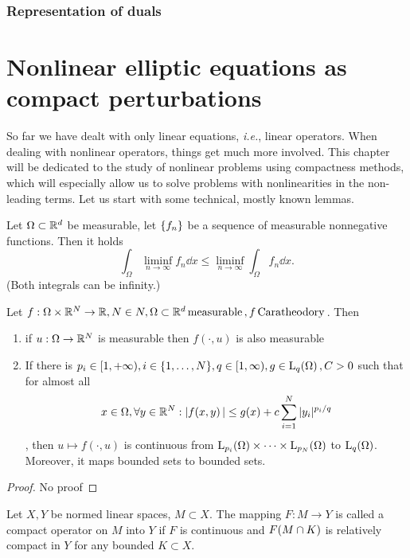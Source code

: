 \documentclass{article}
\begin{document}
\subsubsection{Representation of duals}
\label{sec:dual_representation}

\section{Nonlinear elliptic equations as compact perturbations}
\label{sec:nonlinear_elliptic_compact}

So far we have dealt with only linear equations, \textit{i.e.}, linear operators. When dealing with nonlinear operators, things get much more involved. This chapter will be dedicated to the study of nonlinear problems using compactness methods, which will especially allow us to solve problems with nonlinearities in the non-leading terms. Let us start with some technical, mostly known lemmas.

\begin{lemma}[Fatou]
	Let $\Omega \subset {\mathbb R}^{d}$ be measurable, let $\qty{f_n}$ be a sequence of measurable nonnegative functions. Then it holds
	\[
		\int_{\Omega}\liminf_{n\to \infty}f_n\dd{x} \leq \liminf_{n \to \infty}\int_{\Omega}f_n\dd{x}.
	\]
	(Both integrals can be infinity.)
    
\end{lemma}

\begin{theorem}[Nemytskii]
	Let $f: \Omega \times {\mathbb R}^N \to {\mathbb R}, N \in N, \Omega \subset {\mathbb R}^d \, \text{measurable} \,, f \, \text{Caratheodory} \,$. Then
	\begin{enumerate}
		\item if $u: \Omega \to {\mathbb R}^N$ is measurable then $f(\cdot, u)$ is also measurable
		\item If there is $p_i \in [1, +\infty), i \in \{1,\dots,N\}, q \in [1, \infty), g \in \LpSet[q]{\Omega}, C>0$ such that for almost all
			\[
				x \in \Omega, \forall y \in {\mathbb R}^N: |f\qty(x,y)| \leq g(x) + c \sum_{i=1}^N |y_i|^{p_i/q}
			\]
			, then $u \mapsto f(\cdot, u)$ is continuous from $\LpSet[p_i]{\Omega} \times \dots \times \LpSet[p_N]{\Omega}$ to $\LpSet[q]{\Omega}$. Moreover, it maps bounded sets to bounded sets.
	\end{enumerate}
\end{theorem}
\begin{proof}
	No proof
\end{proof}

\begin{definition}
	Let $X,Y$ be normed linear spaces, $M \subset X.$ The mapping $F:M \to Y$ is called a compact operator on $M$ into $Y$ if $F$ is continuous and $F\qty(M \cap K)$ is relatively compact in $Y$ for any bounded $K \subset X.$
\end{definition}
\end{document}
